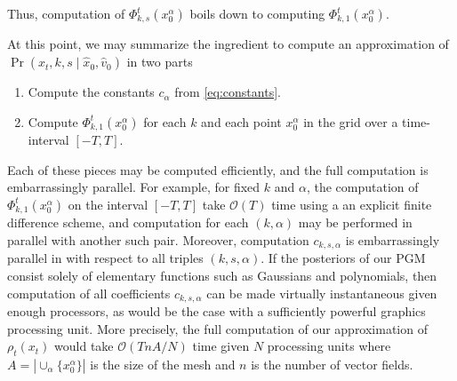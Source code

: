 \documentclass[conference]{IEEEtran}
\begin{document}
Thus, computation of $\Phi_{k,s}^t( x_0^{\alpha})$ boils down to computing $\Phi_{k,1}^t(x_0^{\alpha})$.

At this point, we may summarize the ingredient to compute an approximation of $\Pr( x_t ,k,s \mid \hat{x}_0, \hat{v}_0 )$ in two parts
\begin{enumerate}
	\item Compute the constants $c_{\alpha}$ from \eqref{eq:constants}.
	\item Compute $\Phi_{k,1}^t(x_0^{\alpha})$ for each $k$ and each point $x_0^{\alpha}$ in the grid over a time-interval $[-T,T]$.
\end{enumerate}
Each of these pieces may be computed efficiently, and the full computation is embarrassingly parallel.
For example, for fixed $k$ and $\alpha$, the computation of $\Phi_{k,1}^t(x_0^{\alpha})$ on the interval $[-T,T]$ take $\mathcal{O}(T)$ time using a
an explicit finite difference scheme, and computation for each $(k,\alpha)$ may be performed in parallel with another such pair.
Moreover, computation $c_{k,s,\alpha}$ is embarrassingly parallel in with respect to all triples $(k,s,\alpha)$.
If the posteriors of our PGM consist solely of elementary functions such as Gaussians and polynomials, then computation of all coefficients $c_{k,s,\alpha}$
can be made virtually instantaneous given enough processors, as would be the case with a sufficiently powerful graphics processing unit.
More precisely, the full computation of our approximation of $\rho_t(x_t)$ would take $\mathcal{O}( T n A / N )$ time given $N$ processing units
where $A = | \cup_\alpha \{ x_0^\alpha\} |$ is the size of the mesh and $n$ is the number of vector fields.


%  
  
\end{document}

